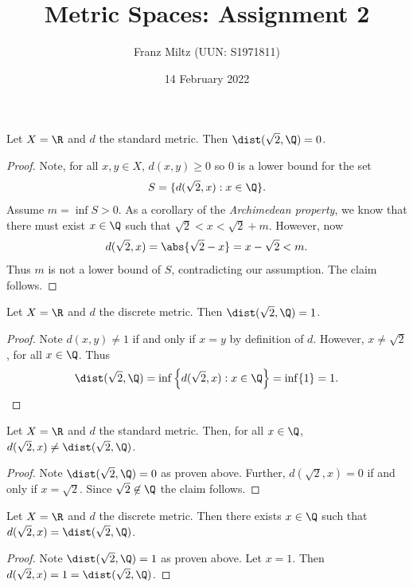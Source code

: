\documentclass{article}
\begin{document}
\title{Metric Spaces: Assignment 2}
\author{Franz Miltz (UUN: S1971811)}
\date{14 February 2022}
\maketitle

\begin{claim*}[1a]
   Let $X=\R$ and $d$ the standard metric. Then $\dist(\sqrt 2, \Q)=0$.
   \begin{proof}
      Note, for all $x,y\in X$, $d(x,y) \geq 0$ so $0$ is a lower bound for the set 
      \begin{align*}
         S=\{d(\sqrt 2,x):x\in\Q\}.
      \end{align*}
      Assume $m=\inf S>0$. As a corollary of the \emph{Archimedean property}, we know that 
      there must exist $x\in\Q$ such that $\sqrt 2 < x < \sqrt{2}+m$. 
      However, now 
      \begin{align*}
         d(\sqrt 2, x) = \abs{\sqrt 2 - x} = x - \sqrt{2} < m.
      \end{align*}
      Thus $m$ is not a lower bound of $S$, contradicting our assumption. The claim follows.
   \end{proof}
\end{claim*}

\begin{claim*}[1b]
   Let $X=\R$ and $d$ the discrete metric. Then $\dist(\sqrt 2, \Q)=1$.
   \begin{proof}
      Note $d(x,y)\not=1$ if and only if $x=y$ by definition of $d$. However,
      $x\not=\sqrt{2}$, for all $x\in\Q$. Thus 
      \begin{align*}
         \dist(\sqrt 2,\Q) = \inf\left\lbrace d(\sqrt 2, x) : x\in\Q\right\rbrace = \inf\{1\} = 1.
      \end{align*}
   \end{proof}
\end{claim*}

\begin{claim*}[2]
   Let $X=\R$ and $d$ the standard metric. Then, for all $x\in\Q$, $d(\sqrt 2, x)\not=\dist(\sqrt 2, \Q)$.
   \begin{proof}
      Note $\dist(\sqrt 2, \Q)=0$ as proven above. Further, $d(\sqrt 2, x)=0$ if and only if 
      $x=\sqrt 2$. Since $\sqrt 2\not\in\Q$ the claim follows.
   \end{proof}
\end{claim*}

\begin{claim*}[2]
   Let $X=\R$ and $d$ the discrete metric. Then there exists $x\in\Q$ such that 
   $d(\sqrt 2, x) = \dist(\sqrt 2, \Q)$.
   \begin{proof}
      Note $\dist(\sqrt 2, \Q)=1$ as proven above. Let $x=1$. Then $d(\sqrt 2, x)=1=\dist(\sqrt 2, \Q)$. 
   \end{proof}
\end{claim*}
\end{document}
